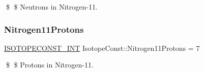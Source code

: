 \$ \$ Neutrons in Nitrogen-\/11. \mbox{\label{group___isotope_const-_nitrogen-_n11_gaac38f39dc6567422dc4aa16e44ca9d30}} 
\subsubsection{\texorpdfstring{Nitrogen11\+Protons}{Nitrogen11Protons}}
{\footnotesize\ttfamily \mbox{\hyperlink{group___isotope_const-_macros_ga5f18360b3e99483a35c32d789e62621c}{I\+S\+O\+T\+O\+P\+E\+C\+O\+N\+S\+T\+\_\+\+I\+NT}} Isotope\+Const\+::\+Nitrogen11\+Protons = 7}

\$ \$ Protons in Nitrogen-\/11. 